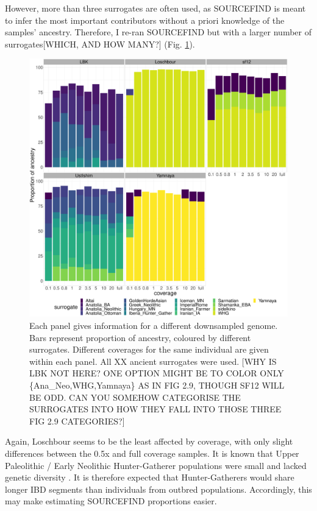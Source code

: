 However, more than {\color{red}three} surrogates are often used, {\color{red}as SOURCEFIND is meant to infer the most important contributors without a priori knowledge of the samples' ancestry. Therefore,} I re-ran SOURCEFIND but with a {\color{red}larger number of surrogates[WHICH, AND HOW MANY?]} (Fig. \ref{fig:SOURCEFIND_AllPSop_downsampled}). 

\begin{figure}[htp]
    \centering
    \includegraphics[width=1.0\textwidth]{../images/chapter1/Allpops_SF_downsampled.pdf}
    \caption{Each panel gives information for a different downsampled genome. Bars represent proportion of ancestry, coloured by different surrogates. Different coverages for the same individual are given within each panel. All {\color{red}XX} ancient surrogates were used. {\color{red}[WHY IS LBK NOT HERE? ONE OPTION MIGHT BE TO COLOR ONLY \{Ana\_Neo,WHG,Yamnaya\} AS IN FIG 2.9, THOUGH SF12 WILL BE ODD. CAN YOU SOMEHOW CATEGORISE THE SURROGATES INTO HOW THEY FALL INTO THOSE THREE FIG 2.9 CATEGORIES?]}}
    \label{fig:SOURCEFIND_AllPSop_downsampled}
\end{figure}

Again, Loschbour seems to be the least affected by coverage, with only slight differences between the 0.5x and full coverage samples. It is known that Upper Paleolithic / Early Neolithic Hunter-Gatherer populations were small and lacked genetic diversity \cite{excoffier1999hunter, Lazaridis2014, Fu2016}. It is therefore expected that Hunter-Gatherers would share longer IBD segments than individuals from outbred populations. Accordingly, this may make estimating SOURCEFIND proportions easier.

